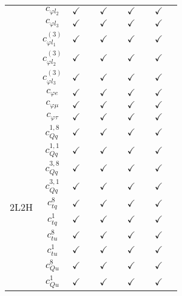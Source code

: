 \documentclass{article}
\begin{document}
\begin{table}[H]
\begin{tabular}{|c|c|c|c|c|c|c|c|c|c|}
 & $c_{\varphi l_2}$ & $\checkmark$ &  & $\checkmark$ &  & $\checkmark$ &  & $\checkmark$ & \\ \cline{2-10}
 & $c_{\varphi l_3}$ & $\checkmark$ &  & $\checkmark$ &  & $\checkmark$ &  & $\checkmark$ & \\ \cline{2-10}
 & $c_{\varphi l_1}^{(3)}$ & $\checkmark$ &  & $\checkmark$ &  & $\checkmark$ &  & $\checkmark$ & \\ \cline{2-10}
 & $c_{\varphi l_2}^{(3)}$ & $\checkmark$ &  & $\checkmark$ &  & $\checkmark$ &  & $\checkmark$ & \\ \cline{2-10}
 & $c_{\varphi l_3}^{(3)}$ & $\checkmark$ &  & $\checkmark$ &  & $\checkmark$ &  & $\checkmark$ & \\ \cline{2-10}
 & $c_{\varphi e}$ & $\checkmark$ &  & $\checkmark$ &  & $\checkmark$ &  & $\checkmark$ & \\ \cline{2-10}
 & $c_{\varphi \mu}$ & $\checkmark$ &  & $\checkmark$ &  & $\checkmark$ &  & $\checkmark$ & \\ \cline{2-10}
 & $c_{\varphi \tau}$ & $\checkmark$ &  & $\checkmark$ &  & $\checkmark$ &  & $\checkmark$ & 
\\ \hline
\multirow{14}{*}{2L2H}
 & $c_{Qq}^{1,8}$ & $\checkmark$ &  & $\checkmark$ &  & $\checkmark$ &  & $\checkmark$ & \\ \cline{2-10}
 & $c_{Qq}^{1,1}$ & $\checkmark$ &  & $\checkmark$ &  & $\checkmark$ &  & $\checkmark$ & \\ \cline{2-10}
 & $c_{Qq}^{3,8}$ & $\checkmark$ &  & $\checkmark$ &  & $\checkmark$ &  & $\checkmark$ & \\ \cline{2-10}
 & $c_{Qq}^{3,1}$ & $\checkmark$ &  & $\checkmark$ &  & $\checkmark$ &  & $\checkmark$ & \\ \cline{2-10}
 & $c_{tq}^{8}$ & $\checkmark$ &  & $\checkmark$ &  & $\checkmark$ &  & $\checkmark$ & \\ \cline{2-10}
 & $c_{tq}^{1}$ & $\checkmark$ &  & $\checkmark$ &  & $\checkmark$ &  & $\checkmark$ & \\ \cline{2-10}
 & $c_{tu}^{8}$ & $\checkmark$ &  & $\checkmark$ &  & $\checkmark$ &  & $\checkmark$ & \\ \cline{2-10}
 & $c_{tu}^{1}$ & $\checkmark$ &  & $\checkmark$ &  & $\checkmark$ &  & $\checkmark$ & \\ \cline{2-10}
 & $c_{Qu}^{8}$ & $\checkmark$ &  & $\checkmark$ &  & $\checkmark$ &  & $\checkmark$ & \\ \cline{2-10}
 & $c_{Qu}^{1}$ & $\checkmark$ &  & $\checkmark$ &  & $\checkmark$ &  & $\checkmark$ & \\ \cline{2-10}

\end{tabular}
\end{table}
\end{document}
